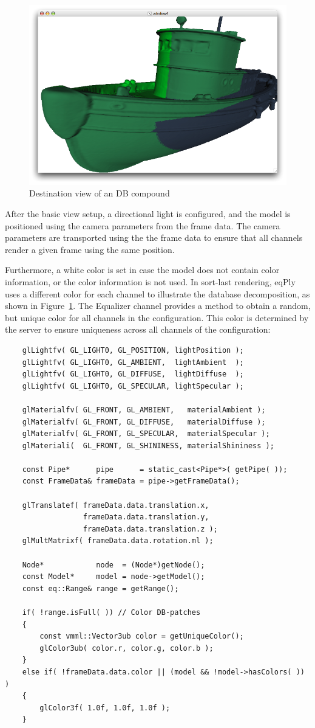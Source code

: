 \documentclass[10pt,a4]{scrartcl}
\newcommand{\fig}[1]{Figure~\ref{#1}}
\begin{document}
\begin{figure}
  \includegraphics[width=.4\textwidth]{images/DB.pdf}
  {\caption{\small\label{fDB}Destination view of an DB compound}}
\end{figure}
After the basic view setup, a directional light is configured, and the
model is positioned using the camera parameters from the frame data. The
camera parameters are transported using the the frame data to ensure
that all channels render a given frame using the same position.

Furthermore, a white color is set in case the model does not contain
color information, or the color information is not used. In
sort-last rendering, \textsf{eqPly} uses a different color for each
channel to illustrate the database decomposition, as shown in
\fig{fDB}. The Equalizer channel provides a method to obtain a random,
but unique color for all channels in the configuration. This color is
determined by the server to ensure uniqueness across all channels of the
configuration:

{\footnotesize\begin{lstlisting}
    glLightfv( GL_LIGHT0, GL_POSITION, lightPosition );
    glLightfv( GL_LIGHT0, GL_AMBIENT,  lightAmbient  );
    glLightfv( GL_LIGHT0, GL_DIFFUSE,  lightDiffuse  );
    glLightfv( GL_LIGHT0, GL_SPECULAR, lightSpecular );

    glMaterialfv( GL_FRONT, GL_AMBIENT,   materialAmbient );
    glMaterialfv( GL_FRONT, GL_DIFFUSE,   materialDiffuse );
    glMaterialfv( GL_FRONT, GL_SPECULAR,  materialSpecular );
    glMateriali(  GL_FRONT, GL_SHININESS, materialShininess );

    const Pipe*      pipe      = static_cast<Pipe*>( getPipe( ));
    const FrameData& frameData = pipe->getFrameData();

    glTranslatef( frameData.data.translation.x,
                  frameData.data.translation.y,
                  frameData.data.translation.z );
    glMultMatrixf( frameData.data.rotation.ml );

    Node*            node  = (Node*)getNode();
    const Model*     model = node->getModel();
    const eq::Range& range = getRange();

    if( !range.isFull( )) // Color DB-patches
    {
        const vmml::Vector3ub color = getUniqueColor();
        glColor3ub( color.r, color.g, color.b );
    }
    else if( !frameData.data.color || (model && !model->hasColors( )) )
    {
        glColor3f( 1.0f, 1.0f, 1.0f );
    }
    
\end{lstlisting}}
\end{document}
